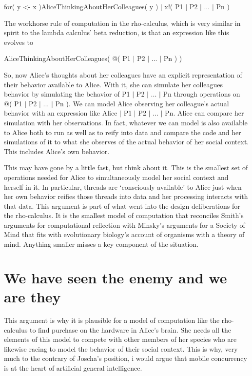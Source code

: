 \documentclass[10pt]{report}
\begin{document}
\vspace{1\baselineskip}
for( y <- x )AliceThinkingAboutHerColleagues( y ) $\vert$ x!( P1 $\vert$ P2 $\vert$ $\ldots$ $\vert$ Pn )

\vspace{1\baselineskip}
The workhorse rule of computation in the rho-calculus, which is very similar in spirit to the lambda calculus’ beta reduction, is that an expression like this evolves to

\vspace{1\baselineskip}
AliceThinkingAboutHerColleagues( @( P1 $\vert$ P2 $\vert$ $\ldots$ $\vert$ Pn ) )

\vspace{1\baselineskip}
So, now Alice’s thoughts about her colleagues have an explicit representation of their behavior available to Alice. With it, she can simulate her colleagues behavior by simulating the behavior of P1 $\vert$ P2 $\vert$ ... $\vert$ Pn through operations on @( P1 $\vert$ P2 $\vert$ ... $\vert$ Pn ). We can model Alice observing her colleague’s actual behavior with an expression like Alice $\vert$ P1 $\vert$ P2 $\vert$ ... $\vert$ Pn. Alice can compare her simulation with her observations. In fact, whatever we can model is also available to Alice both to run as well as to reify into data and compare the code and her simulations of it to what she observes of the actual behavior of her social context. This includes Alice’s own behavior. 

\vspace{1\baselineskip}
This may have gone by a little fast, but think about it. This is the smallest set of operations needed for Alice to simultaneously model her social context and herself in it. In particular, threads are ‘consciously available’ to Alice just when her own behavior reifies those threads into data and her processing interacts with that data. This argument is part of what went into the design deliberations for the rho-calculus. It is the smallest model of computation that reconciles Smith’s arguments for computational reflection with Minsky’s arguments for a Society of Mind that fits with evolutionary biology’s account of organisms with a theory of mind. Anything smaller misses a key component of the situation.

\vspace{1\baselineskip}
\section{We have seen the enemy and we are they}

This argument is why it is plausible for a model of computation like the rho-calculus to find purchase on the hardware in Alice’s brain. She needs all the elements of this model to compete with other members of her species who are likewise racing to model the behavior of their social context. This is why, very much to the contrary of Joscha’s position, i would argue that mobile concurrency is at the heart of artificial general intelligence.
\end{document}
